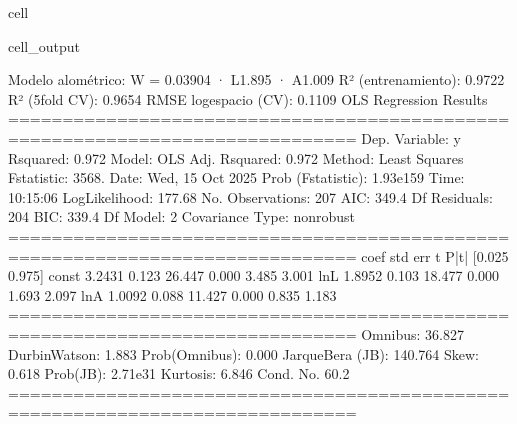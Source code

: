 \documentclass[a4paper,10pt,spanish]{jupyterBook}
\begin{document}
\begin{sphinxuseclass}{cell}
\begin{sphinxVerbatimOutput}
\begin{sphinxuseclass}{cell_output}
\begin{sphinxVerbatim}[commandchars=\\\{\}]
Modelo alométrico:  W = 0.03904 · L\PYGZca{}1.895 · A\PYGZca{}1.009
R² (entrenamiento): 0.9722
R² (5\PYGZhy{}fold CV):     0.9654
RMSE log\PYGZhy{}espacio (CV): 0.1109
                            OLS Regression Results
==============================================================================
Dep. Variable:                      y   R\PYGZhy{}squared:                       0.972
Model:                            OLS   Adj. R\PYGZhy{}squared:                  0.972
Method:                 Least Squares   F\PYGZhy{}statistic:                     3568.
Date:                Wed, 15 Oct 2025   Prob (F\PYGZhy{}statistic):          1.93e\PYGZhy{}159
Time:                        10:15:06   Log\PYGZhy{}Likelihood:                 177.68
No. Observations:                 207   AIC:                            \PYGZhy{}349.4
Df Residuals:                     204   BIC:                            \PYGZhy{}339.4
Df Model:                           2
Covariance Type:            nonrobust
==============================================================================
                 coef    std err          t      P\PYGZgt{}|t|      [0.025      0.975]
\PYGZhy{}\PYGZhy{}\PYGZhy{}\PYGZhy{}\PYGZhy{}\PYGZhy{}\PYGZhy{}\PYGZhy{}\PYGZhy{}\PYGZhy{}\PYGZhy{}\PYGZhy{}\PYGZhy{}\PYGZhy{}\PYGZhy{}\PYGZhy{}\PYGZhy{}\PYGZhy{}\PYGZhy{}\PYGZhy{}\PYGZhy{}\PYGZhy{}\PYGZhy{}\PYGZhy{}\PYGZhy{}\PYGZhy{}\PYGZhy{}\PYGZhy{}\PYGZhy{}\PYGZhy{}\PYGZhy{}\PYGZhy{}\PYGZhy{}\PYGZhy{}\PYGZhy{}\PYGZhy{}\PYGZhy{}\PYGZhy{}\PYGZhy{}\PYGZhy{}\PYGZhy{}\PYGZhy{}\PYGZhy{}\PYGZhy{}\PYGZhy{}\PYGZhy{}\PYGZhy{}\PYGZhy{}\PYGZhy{}\PYGZhy{}\PYGZhy{}\PYGZhy{}\PYGZhy{}\PYGZhy{}\PYGZhy{}\PYGZhy{}\PYGZhy{}\PYGZhy{}\PYGZhy{}\PYGZhy{}\PYGZhy{}\PYGZhy{}\PYGZhy{}\PYGZhy{}\PYGZhy{}\PYGZhy{}\PYGZhy{}\PYGZhy{}\PYGZhy{}\PYGZhy{}\PYGZhy{}\PYGZhy{}\PYGZhy{}\PYGZhy{}\PYGZhy{}\PYGZhy{}\PYGZhy{}\PYGZhy{}
const         \PYGZhy{}3.2431      0.123    \PYGZhy{}26.447      0.000      \PYGZhy{}3.485      \PYGZhy{}3.001
lnL            1.8952      0.103     18.477      0.000       1.693       2.097
lnA            1.0092      0.088     11.427      0.000       0.835       1.183
==============================================================================
Omnibus:                       36.827   Durbin\PYGZhy{}Watson:                   1.883
Prob(Omnibus):                  0.000   Jarque\PYGZhy{}Bera (JB):              140.764
Skew:                          \PYGZhy{}0.618   Prob(JB):                     2.71e\PYGZhy{}31
Kurtosis:                       6.846   Cond. No.                         60.2
==============================================================================


\end{sphinxVerbatim}
\end{sphinxuseclass}
\end{sphinxVerbatimOutput}
\end{sphinxuseclass}
\end{document}
